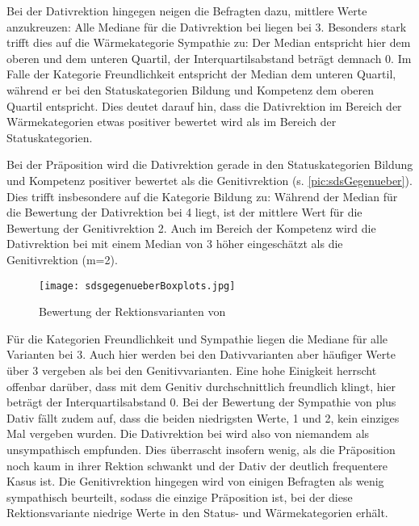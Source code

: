 Bei der Dativrektion hingegen neigen die Befragten dazu, mittlere Werte anzukreuzen:
Alle Mediane für die Dativrektion bei \dank{} liegen bei 3. 
Besonders stark trifft dies auf die Wärmekategorie Sympathie zu: 
Der Median entspricht hier dem oberen und dem unteren Quartil, der Interquartilsabstand beträgt demnach 0. 
Im Falle der Kategorie Freundlichkeit entspricht der Median dem unteren Quartil, während er bei den Statuskategorien Bildung und Kompetenz dem oberen Quartil entspricht. 
Dies deutet darauf hin, dass die Dativrektion im Bereich der Wärmekategorien etwas positiver bewertet wird als im Bereich der Statuskategorien.

Bei der Präposition \gegenueber{} wird die Dativrektion gerade in den Statuskategorien Bildung und Kompetenz positiver bewertet als die Genitivrektion (s. \autoref{pic:sdsGegenueber}). 
Dies trifft insbesondere auf die Kategorie Bildung zu:
Während der Median für die Bewertung der Dativrektion bei 4 liegt, ist der mittlere Wert für die Bewertung der Genitivrektion 2. 
Auch im Bereich der Kompetenz wird die Dativrektion bei \gegenueber{} mit einem Median von 3 höher eingeschätzt als die Genitivrektion (m=2). 
\begin{figure}
\centering
\texttt{[image: sdsgegenueberBoxplots.jpg]}
\caption{Bewertung der Rektionsvarianten von \gegenueber}
\label{pic:sdsGegenueber}
\end{figure}

Für die Kategorien Freundlichkeit und Sympathie liegen die Mediane für alle Varianten bei 3. 
Auch hier werden bei den Dativvarianten aber häufiger Werte über 3 vergeben als bei den Genitivvarianten. 
Eine hohe Einigkeit herrscht offenbar darüber, dass \gegenueber{} mit dem Genitiv durchschnittlich freundlich klingt, hier beträgt der Interquartilsabstand 0.  
Bei der Bewertung der Sympathie von \gegenueber{} plus Dativ fällt zudem auf, dass die beiden niedrigsten Werte, 1 und 2, kein einziges Mal vergeben wurden. 
Die Dativrektion bei \gegenueber{} wird also von niemandem als unsympathisch empfunden.
Dies überrascht insofern wenig, als die Präposition noch kaum in ihrer Rektion schwankt und der Dativ der deutlich frequentere Kasus ist. %
Die Genitivrektion hingegen wird von einigen Befragten als wenig sympathisch beurteilt, sodass \gegenueber{} die einzige Präposition ist, bei der diese Rektionsvariante niedrige Werte in den Status- und Wärmekategorien erhält. %

